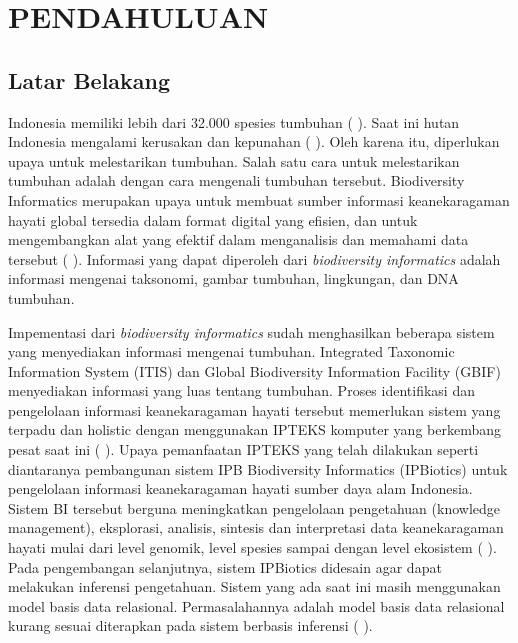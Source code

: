\section*{PENDAHULUAN} %
\subsection*{Latar Belakang}
Indonesia memiliki lebih dari 32.000 spesies tumbuhan (\citeauthor{BAPPENAS2003} \cite*{BAPPENAS2003}). Saat ini hutan Indonesia mengalami kerusakan dan kepunahan (\citeauthor{ZUHUD2008} \cite*{ZUHUD2008}). Oleh karena itu, diperlukan upaya untuk melestarikan tumbuhan. Salah satu cara untuk melestarikan tumbuhan adalah dengan cara mengenali tumbuhan tersebut. Biodiversity Informatics merupakan upaya untuk membuat sumber informasi keanekaragaman hayati global tersedia dalam format digital yang efisien, dan untuk mengembangkan alat yang efektif dalam menganalisis dan memahami data tersebut (\citeauthor{GILLMANE2009} \cite*{GILLMANE2009}). Informasi yang dapat diperoleh dari \textit{biodiversity informatics} adalah informasi mengenai taksonomi, gambar tumbuhan, lingkungan, dan DNA tumbuhan. 

Impementasi dari \textit{biodiversity informatics} sudah menghasilkan beberapa sistem yang menyediakan informasi mengenai tumbuhan.  Integrated Taxonomic Information System  (ITIS) dan Global Biodiversity Information Facility (GBIF) menyediakan informasi yang luas tentang tumbuhan. Proses identifikasi dan pengelolaan informasi keanekaragaman hayati tersebut memerlukan sistem yang terpadu dan holistic dengan menggunakan IPTEKS komputer yang berkembang pesat saat ini (\citeauthor{HERDIYENI2013} \cite*{HERDIYENI2013}). Upaya pemanfaatan IPTEKS yang telah dilakukan seperti diantaranya pembangunan sistem IPB Biodiversity Informatics (IPBiotics) untuk pengelolaan informasi keanekaragaman hayati sumber daya alam Indonesia. Sistem BI tersebut berguna meningkatkan pengelolaan pengetahuan (knowledge management), eksplorasi, analisis, sintesis dan interpretasi data keanekaragaman hayati mulai dari level genomik, level spesies sampai dengan level ekosistem (\citeauthor{HERDIYENI2013} \cite*{HERDIYENI2013}). Pada pengembangan selanjutnya, sistem IPBiotics didesain agar dapat melakukan inferensi pengetahuan. Sistem yang ada saat ini masih menggunakan model basis data relasional. Permasalahannya adalah model basis data relasional kurang sesuai diterapkan pada sistem berbasis inferensi (\citeauthor{LAALLAM2013} \cite*{LAALLAM2013}).  

